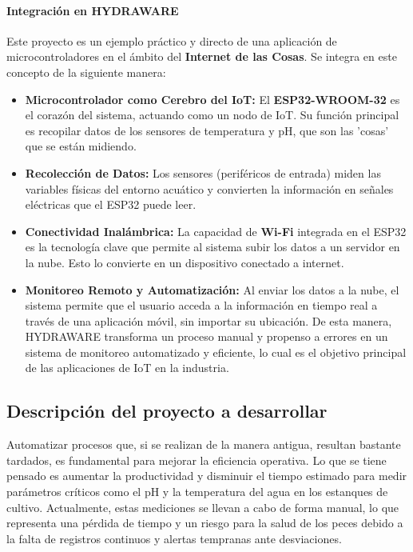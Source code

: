 \documentclass[a4paper,12pt]{article}
\begin{document}
	\paragraph{Integración en HYDRAWARE}
	Este proyecto es un ejemplo práctico y directo de una aplicación de microcontroladores en el ámbito del \textbf{Internet de las Cosas}. Se integra en este concepto de la siguiente manera:
	\begin{itemize}
		\item \textbf{Microcontrolador como Cerebro del IoT:} El \textbf{ESP32-WROOM-32} es el corazón del sistema, actuando como un nodo de IoT. Su función principal es recopilar datos de los sensores de temperatura y pH, que son las 'cosas' que se están midiendo.
		\item \textbf{Recolección de Datos:} Los sensores (periféricos de entrada) miden las variables físicas del entorno acuático y convierten la información en señales eléctricas que el ESP32 puede leer.
		\item \textbf{Conectividad Inalámbrica:} La capacidad de \textbf{Wi-Fi} integrada en el ESP32 es la tecnología clave que permite al sistema subir los datos a un servidor en la nube. Esto lo convierte en un dispositivo conectado a internet.
		\item \textbf{Monitoreo Remoto y Automatización:} Al enviar los datos a la nube, el sistema permite que el usuario acceda a la información en tiempo real a través de una aplicación móvil, sin importar su ubicación. De esta manera, HYDRAWARE transforma un proceso manual y propenso a errores en un sistema de monitoreo automatizado y eficiente, lo cual es el objetivo principal de las aplicaciones de IoT en la industria.
	\end{itemize}
	
	
	
	
	\subsection{Descripción del proyecto a desarrollar}
	Automatizar procesos que, si se realizan de la manera antigua, resultan bastante tardados, es fundamental para mejorar la eficiencia operativa. Lo que se tiene pensado es aumentar la productividad y disminuir el tiempo estimado para medir parámetros críticos como el pH y la temperatura del agua en los estanques de cultivo. Actualmente, estas mediciones se llevan a cabo de forma manual, lo que representa una pérdida de tiempo y un riesgo para la salud de los peces debido a la falta de registros continuos y alertas tempranas ante desviaciones.
	
\end{document}
